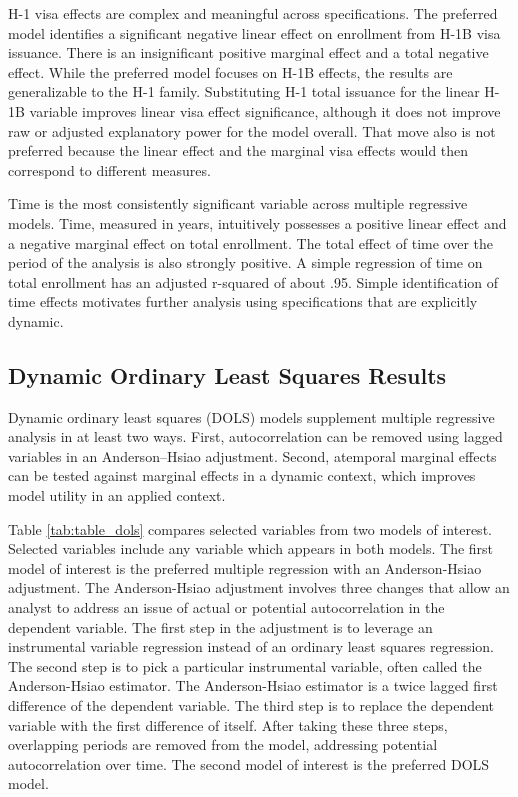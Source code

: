 \documentclass[review]{elsarticle}
\begin{document}
H-1 visa effects are complex and meaningful across specifications.
The preferred model identifies a significant negative linear effect on enrollment
from H-1B visa issuance.
There is an insignificant positive marginal effect and a total negative effect.
While the preferred model focuses on H-1B effects,
the results are generalizable to the H-1 family.
Substituting H-1 total issuance for the linear H-1B variable improves
linear visa effect significance,
although it does not improve raw or adjusted explanatory power for the model overall.
That move also is not preferred because the linear effect and the marginal visa effects would then correspond to different measures.

Time is the most consistently significant variable across multiple regressive models.
Time, measured in years, intuitively possesses a positive linear effect and a negative marginal effect on total enrollment.
The total effect of time over the period of the analysis is also strongly positive.
A simple regression of time on total enrollment has an adjusted r-squared of about .95.
Simple identification of time effects motivates further analysis using specifications that are explicitly dynamic.

\subsection{Dynamic Ordinary Least Squares Results}

Dynamic ordinary least squares (DOLS) models supplement multiple regressive analysis in at least two ways.
First, autocorrelation can be removed using lagged variables in an Anderson–Hsiao adjustment\cite{anderson1981estimation}.
Second, atemporal marginal effects can be tested against marginal effects in a dynamic context,
which improves model utility in an applied context.

Table \ref{tab:table_dols} compares selected variables from two models of interest.
Selected variables include any variable which appears in both models.
The first model of interest is the preferred multiple regression with an Anderson-Hsiao adjustment.
The Anderson-Hsiao adjustment involves three changes that allow an analyst to address an issue of actual or potential autocorrelation in the dependent variable.
The first step in the adjustment is to leverage an instrumental variable regression instead of an ordinary least squares regression.
The second step is to pick a particular instrumental variable, often called the Anderson-Hsiao estimator.
The Anderson-Hsiao estimator is a twice lagged first difference of the dependent variable.
The third step is to replace the dependent variable with the first difference of itself.
After taking these three steps, overlapping periods are removed from the model, addressing potential autocorrelation over time.
The second model of interest is the preferred DOLS model.
\end{document}
